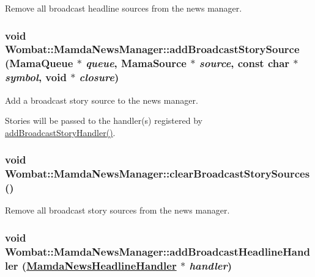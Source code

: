 Remove all broadcast headline sources from the news manager. 

\hypertarget{classWombat_1_1MamdaNewsManager_0171e640fc993e3e8ed18a969b50cfce}{
\subsubsection[addBroadcastStorySource]{\setlength{\rightskip}{0pt plus 5cm}void Wombat::Mamda\-News\-Manager::add\-Broadcast\-Story\-Source (Mama\-Queue $\ast$ {\em queue}, Mama\-Source $\ast$ {\em source}, const char $\ast$ {\em symbol}, void $\ast$ {\em closure})}}
\label{classWombat_1_1MamdaNewsManager_0171e640fc993e3e8ed18a969b50cfce}


Add a broadcast story source to the news manager. 

Stories will be passed to the handler(s) registered by \hyperlink{classWombat_1_1MamdaNewsManager_2b8b967d8a889c793f74f0a8c852a1d7}{add\-Broadcast\-Story\-Handler()}. \hypertarget{classWombat_1_1MamdaNewsManager_cd90050516edb35d2032bf4d3bed6865}{
\subsubsection[clearBroadcastStorySources]{\setlength{\rightskip}{0pt plus 5cm}void Wombat::Mamda\-News\-Manager::clear\-Broadcast\-Story\-Sources ()}}
\label{classWombat_1_1MamdaNewsManager_cd90050516edb35d2032bf4d3bed6865}


Remove all broadcast story sources from the news manager. 

\hypertarget{classWombat_1_1MamdaNewsManager_9fc593b6b72946a4a62cfba27412417d}{
\subsubsection[addBroadcastHeadlineHandler]{\setlength{\rightskip}{0pt plus 5cm}void Wombat::Mamda\-News\-Manager::add\-Broadcast\-Headline\-Handler (\hyperlink{classWombat_1_1MamdaNewsHeadlineHandler}{Mamda\-News\-Headline\-Handler} $\ast$ {\em handler})}}
\label{classWombat_1_1MamdaNewsManager_9fc593b6b72946a4a62cfba27412417d}


